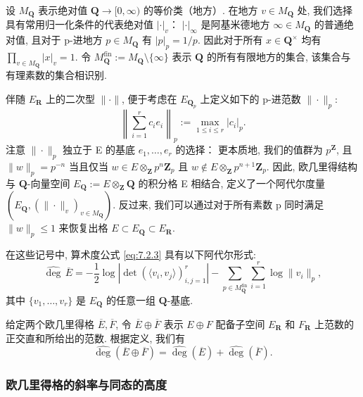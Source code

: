 设 \(M_{\mathbf{Q}}\) 表示绝对值 \(\mathbf{Q} \to [0,\infty)\) 的等价类（地方）. 
在地方 \(v \in M_{\mathbf{Q}}\) 处, 我们选择具有常用归一化条件的代表绝对值 \(|\cdot|_v\)：
\(|\cdot|_{\infty}\) 是阿基米德地方 \(\infty \in M_{\mathbf{Q}}\) 的普通绝对值, 
且对于 p-进地方 \(p \in M_{\mathbf{Q}}\) 有 \(|p|_p = 1/p\). 
因此对于所有 \(x \in \mathbf{Q}^{\times}\) 均有 \(\prod_{v \in M_{\mathbf{Q}}} |x|_v = 1\). 
令 \(M_{\mathbf{Q}}^{\text{fin}} := M_{\mathbf{Q}} \setminus \{\infty\}\) 表示 \(\mathbf{Q}\) 的所有有限地方的集合, 
该集合与有理素数的集合相识别.

伴随 \(E_{\mathbf{R}}\) 上的二次型 \(\|\cdot\|\), 便于考虑在 \(E_{\mathbf{Q}_p}\) 上定义如下的 p-进范数 \(\|\cdot\|_p\):
\[ \left\| \sum_{i=1}^{r} c_i e_i \right\|_p := \max_{1 \le i \le r} |c_i|_p. \]
注意 \(\|\cdot\|_p\) 独立于 E 的基底 \(e_1,\ldots,e_r\) 的选择：
更本质地, 我们的值群为 \(p^{\mathbf{Z}}\), 
且 \(\|w\|_p = p^{-n}\) 当且仅当 \(w \in E \otimes_{\mathbf{Z}} p^n \mathbf{Z}_p\) 且 \(w \notin E \otimes_{\mathbf{Z}} p^{n+1} \mathbf{Z}_p\). 
因此, 欧几里得结构与 \(\mathbf{Q}\)-向量空间 \(E_{\mathbf{Q}} := E \otimes_{\mathbf{Z}} \mathbf{Q}\) 
的积分格 E 相结合, 定义了一个阿代尔度量 \((E_{\mathbf{Q}}, (\|\cdot\|_v)_{v \in M_{\mathbf{Q}}})\). 
反过来, 我们可以通过对于所有素数 p 同时满足 \(\|w\|_p \leq 1\) 
来恢复出格 \(E \subset E_{\mathbf{Q}} \subset E_{\mathbf{R}}\).

在这些记号中, 算术度公式 \eqref{eq:7.2.3} 具有以下阿代尔形式:
\[ \widehat{\operatorname{deg}} \, \overline{E} = -\frac{1}{2} \log \left| \det \left( \langle v_i, v_j \rangle \right)_{i,j=1}^r \right| - \sum_{p \in M_{\mathbf{Q}}^{\text{fin}}} \sum_{i=1}^r \log \|v_i\|_p, \]
其中 \(\{v_1, \ldots, v_r\}\) 是 \(E_{\mathbf{Q}}\) 的任意一组 \(\mathbf{Q}\)-基底.

给定两个欧几里得格 \(\overline{E}, \overline{F}\), 
令 \(\overline{E} \oplus \overline{F}\) 表示 \(E \oplus F\) 配备子空间 \(E_{\mathbf{R}}\) 和 \(F_{\mathbf{R}}\) 
上范数的正交直和所给出的范数. 根据定义, 我们有
\begin{equation}\label{eq:7.2.4}
\widehat{\operatorname{deg}}\left(\overline{E} \oplus \overline{F}\right) = \widehat{\operatorname{deg}}\left(\overline{E}\right) + \widehat{\operatorname{deg}}\left(\overline{F}\right).
\end{equation}

\subsubsection{欧几里得格的斜率与同态的高度}\label{sec:7.2.5}


